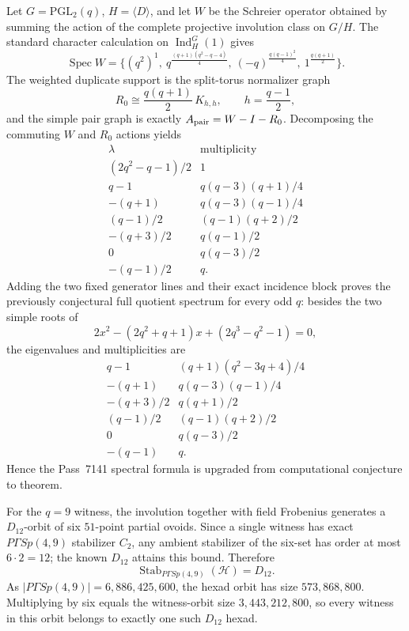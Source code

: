 Let $G=\mathrm{PGL}_2(q)$, $H=\langle D\rangle$, and let $W$ be the Schreier operator obtained by summing the action of the complete projective involution class on $G/H$.  The standard character calculation on $\operatorname{Ind}_H^G(1)$ gives
\[
 \operatorname{Spec}W=
 \{(q^2)^1,\ q^{\frac{(q+1)(q^2-q-4)}4},\ (-q)^{\frac{q(q-1)^2}4},\ 1^{\frac{q(q+1)}2}\}.
\]
The weighted duplicate support is the split-torus normalizer graph
\[
 R_0\cong \frac{q(q+1)}2\,K_{h,h},\qquad h=\frac{q-1}2,
\]
and the simple pair graph is exactly $A_{\rm pair}=W-I-R_0$.  Decomposing the commuting $W$ and $R_0$ actions yields
\[
\begin{array}{c|c}
\lambda&\text{multiplicity}\\ \hline
(2q^2-q-1)/2&1\\
q-1&q(q-3)(q+1)/4\\
-(q+1)&q(q-3)(q-1)/4\\
(q-1)/2&(q-1)(q+2)/2\\
-(q+3)/2&q(q-1)/2\\
0&q(q-3)/2\\
-(q-1)/2&q.
\end{array}
\]
Adding the two fixed generator lines and their exact incidence block proves the previously conjectural full quotient spectrum for every odd $q$: besides the two simple roots of
\[
 2x^2-(2q^2+q+1)x+(2q^3-q^2-1)=0,
\]
the eigenvalues and multiplicities are
\[
\begin{array}{c|c}
q-1&(q+1)(q^2-3q+4)/4\\
-(q+1)&q(q-3)(q-1)/4\\
-(q+3)/2&q(q+1)/2\\
(q-1)/2&(q-1)(q+2)/2\\
0&q(q-3)/2\\
-(q-1)&q.
\end{array}
\]
Hence the Pass~7141 spectral formula is upgraded from computational conjecture to theorem.

For the $q=9$ witness, the involution together with field Frobenius generates a $D_{12}$-orbit of six $51$-point partial ovoids.  Since a single witness has exact $P\Gamma Sp(4,9)$ stabilizer $C_2$, any ambient stabilizer of the six-set has order at most $6\cdot2=12$; the known $D_{12}$ attains this bound.  Therefore
\[
 \boxed{\operatorname{Stab}_{P\Gamma Sp(4,9)}(\mathcal H)=D_{12}}.
\]
As $|P\Gamma Sp(4,9)|=6{,}886{,}425{,}600$, the hexad orbit has size $573{,}868{,}800$.  Multiplying by six equals the witness-orbit size $3{,}443{,}212{,}800$, so every witness in this orbit belongs to exactly one such $D_{12}$ hexad.

